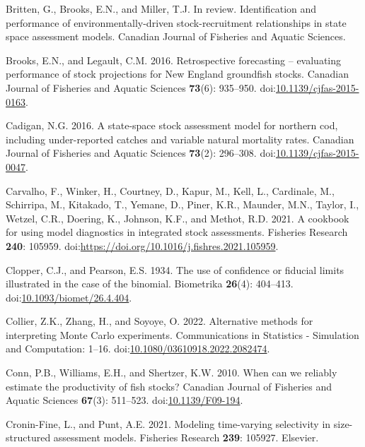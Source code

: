 \documentclass[
  12pt,
]{article}
\newlength{\cslhangindent}
\newenvironment{CSLReferences}[2] %
 {\begin{list}{}{%
  \setlength{\itemindent}{0pt}
  \setlength{\leftmargin}{0pt}
  \setlength{\parsep}{0pt}
  \ifodd #1
   \setlength{\leftmargin}{\cslhangindent}
   \setlength{\itemindent}{-1\cslhangindent}
  \fi
  \setlength{\itemsep}{#2\baselineskip}}}
 {\end{list}}
\begin{document}
\begin{CSLReferences}{1}{0}
Britten, G., Brooks, E.N., and Miller, T.J. In review. Identification
and performance of environmentally-driven stock-recruitment
relationships in state space assessment models. Canadian Journal of
Fisheries and Aquatic Sciences.

Brooks, E.N., and Legault, C.M. 2016. Retrospective forecasting --
evaluating performance of stock projections for {N}ew {E}ngland
groundfish stocks. Canadian Journal of Fisheries and Aquatic Sciences
\textbf{73}(6): 935--950.
doi:\href{https://doi.org/10.1139/cjfas-2015-0163}{10.1139/cjfas-2015-0163}.

Cadigan, N.G. 2016. A state-space stock assessment model for northern
cod, including under-reported catches and variable natural mortality
rates. Canadian Journal of Fisheries and Aquatic Sciences
\textbf{73}(2): 296--308.
doi:\href{https://doi.org/10.1139/cjfas-2015-0047}{10.1139/cjfas-2015-0047}.

Carvalho, F., Winker, H., Courtney, D., Kapur, M., Kell, L., Cardinale,
M., Schirripa, M., Kitakado, T., Yemane, D., Piner, K.R., Maunder, M.N.,
Taylor, I., Wetzel, C.R., Doering, K., Johnson, K.F., and Methot, R.D.
2021. A cookbook for using model diagnostics in integrated stock
assessments. Fisheries Research \textbf{240}: 105959.
doi:\url{https://doi.org/10.1016/j.fishres.2021.105959}.

Clopper, C.J., and Pearson, E.S. 1934. The use of confidence or fiducial
limits illustrated in the case of the binomial. Biometrika
\textbf{26}(4): 404--413.
doi:\href{https://doi.org/10.1093/biomet/26.4.404}{10.1093/biomet/26.4.404}.

Collier, Z.K., Zhang, H., and Soyoye, O. 2022. Alternative methods for
interpreting {M}onte {C}arlo experiments. Communications in Statistics -
Simulation and Computation: 1--16.
doi:\href{https://doi.org/10.1080/03610918.2022.2082474}{10.1080/03610918.2022.2082474}.

Conn, P.B., Williams, E.H., and Shertzer, K.W. 2010. When can we
reliably estimate the productivity of fish stocks? Canadian Journal of
Fisheries and Aquatic Sciences \textbf{67}(3): 511--523.
doi:\href{https://doi.org/10.1139/F09-194}{10.1139/F09-194}.

Cronin-Fine, L., and Punt, A.E. 2021. Modeling time-varying selectivity
in size-structured assessment models. Fisheries Research \textbf{239}:
105927. Elsevier.


\end{CSLReferences}
\end{document}
